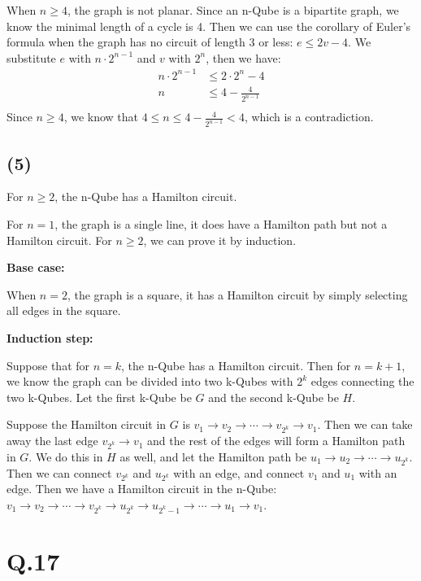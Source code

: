 \documentclass[a4paper,12pt]{article}
\begin{document}
When $n \geq 4$, the graph is not planar.
Since an n-Qube is a bipartite graph, we know the minimal length of a cycle is 4.
Then we can use the corollary of Euler's formula when the graph has no circuit of length 3 or less: $e \leq 2v - 4$.
We substitute $e$ with $n \cdot 2^{n-1}$ and $v$ with $2^{n}$, then we have:
\begin{align*}
	n \cdot 2^{n-1} &\leq 2 \cdot 2^{n} - 4 \\
	n &\leq 4 - \frac{4}{2^{n-1}} \\
\end{align*}
Since $n \geq 4$, we know that $4 \leq n \leq 4 - \frac{4}{2^{n-1}} < 4$, which is a contradiction.

\subsection*{(5)}

For $n \geq 2$, the n-Qube has a Hamilton circuit.

For $n=1$, the graph is a single line, it does have a Hamilton path but not a Hamilton circuit.
For $n \geq 2$, we can prove it by induction.

\textbf{Base case:}

When $n=2$, the graph is a square, it has a Hamilton circuit by simply selecting all edges in the square.

\textbf{Induction step:}

Suppose that for $n=k$, the n-Qube has a Hamilton circuit.
Then for $n=k+1$, we know the graph can be divided into two k-Qubes with $2^{k}$ edges connecting the two k-Qubes.
Let the first k-Qube be $G$ and the second k-Qube be $H$.

Suppose the Hamilton circuit in $G$ is $v_1 \rightarrow v_2 \rightarrow \cdots \rightarrow v_{2^{k}} \rightarrow v_1$.
Then we can take away the last edge $v_{2^{k}} \rightarrow v_1$ and the rest of the edges will form a Hamilton path in $G$.
We do this in $H$ as well, and let the Hamilton path be $u_1 \rightarrow u_2 \rightarrow \cdots \rightarrow u_{2^{k}}$.
Then we can connect $v_{2^{k}}$ and $u_{2^{k}}$ with an edge, and connect $v_1$ and $u_1$ with an edge.
Then we have a Hamilton circuit in the n-Qube: $v_1 \rightarrow v_2 \rightarrow \cdots \rightarrow v_{2^{k}} \rightarrow u_{2^{k}} \rightarrow u_{2^{k}-1} \rightarrow \cdots \rightarrow u_1 \rightarrow v_1$.
\section*{Q.17}
\end{document}
